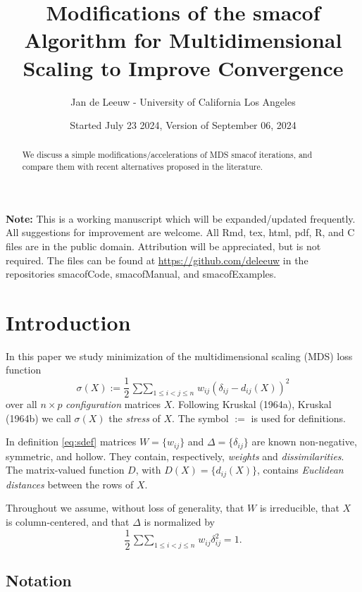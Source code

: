 \documentclass[
  12pt,
]{article}
\title{Modifications of the smacof Algorithm for Multidimensional Scaling to Improve Convergence}
\author{Jan de Leeuw - University of California Los Angeles}
\date{Started July 23 2024, Version of September 06, 2024}
\begin{document}
\maketitle
\begin{abstract}
We discuss a simple modifications/accelerations of MDS smacof iterations, and compare them with recent alternatives proposed in the literature.
\end{abstract}

{
\setcounter{tocdepth}{3}
\tableofcontents
}
\textbf{Note:} This is a working manuscript which will be expanded/updated
frequently. All suggestions for improvement are welcome. All Rmd, tex,
html, pdf, R, and C files are in the public domain. Attribution will be
appreciated, but is not required. The files can be found at
\url{https://github.com/deleeuw} in the repositories smacofCode, smacofManual,
and smacofExamples.

\section{Introduction}\label{introduction}

In this paper we study minimization of the multidimensional scaling (MDS) loss function
\begin{equation}
\sigma(X):=\frac12\mathop{\sum\sum}_{1\leq i<j\leq n} w_{ij}(\delta_{ij}-d_{ij}(X))^2
\label{eq:sdef}
\end{equation}
over all \(n\times p\) \emph{configuration} matrices \(X\). Following Kruskal (1964a), Kruskal (1964b) we call \(\sigma(X)\) the \emph{stress} of \(X\). The symbol \(:=\) is used for definitions.

In definition
\eqref{eq:sdef} matrices \(W=\{w_{ij}\}\) and \(\Delta=\{\delta_{ij}\}\) are known non-negative, symmetric, and hollow. They contain, respectively, \emph{weights} and \emph{dissimilarities}. The matrix-valued function \(D\), with \(D(X)=\{d_{ij}(X)\}\), contains \emph{Euclidean distances} between the rows of \(X\).

Throughout we assume, without loss of generality, that \(W\) is irreducible, that \(X\) is column-centered, and that \(\Delta\) is normalized by
\begin{equation}
\frac12\mathop{\sum\sum}_{1\leq i<j\leq n} w_{ij}\delta_{ij}^2=1.
\label{eq:delnorm}
\end{equation}

\subsection{Notation}\label{notation}
\end{document}
